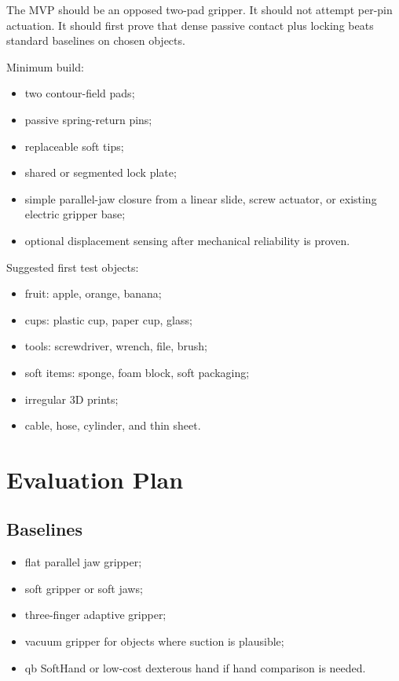 \documentclass[11pt]{article}
\begin{document}
The MVP should be an opposed two-pad gripper. It should not attempt per-pin actuation. It should first prove that dense passive contact plus locking beats standard baselines on chosen objects.

Minimum build:

\begin{itemize}
  \item two contour-field pads;
  \item passive spring-return pins;
  \item replaceable soft tips;
  \item shared or segmented lock plate;
  \item simple parallel-jaw closure from a linear slide, screw actuator, or existing electric gripper base;
  \item optional displacement sensing after mechanical reliability is proven.
\end{itemize}

Suggested first test objects:

\begin{itemize}
  \item fruit: apple, orange, banana;
  \item cups: plastic cup, paper cup, glass;
  \item tools: screwdriver, wrench, file, brush;
  \item soft items: sponge, foam block, soft packaging;
  \item irregular 3D prints;
  \item cable, hose, cylinder, and thin sheet.
\end{itemize}

\section{Evaluation Plan}

\subsection{Baselines}

\begin{itemize}
  \item flat parallel jaw gripper;
  \item soft gripper or soft jaws;
  \item three-finger adaptive gripper;
  \item vacuum gripper for objects where suction is plausible;
  \item qb SoftHand or low-cost dexterous hand if hand comparison is needed.
\end{itemize}
\end{document}
